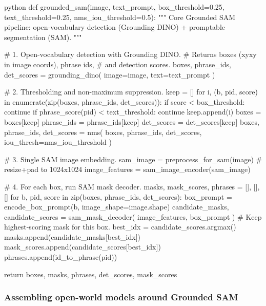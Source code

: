 \begin{enrichment}
\begin{enrichment}
			\begin{mintedbox}{python}
				def grounded_sam(image,       text_prompt,
				    box_threshold=0.25,
				    text_threshold=0.25,
				    nms_iou_threshold=0.5):
				    """
				    Core Grounded SAM pipeline:
				    open-vocabulary detection (Grounding DINO)
				    + promptable segmentation (SAM).
				    """
				
				    # 1. Open-vocabulary detection with Grounding DINO.
				    #    Returns boxes (xyxy in image coords), phrase ids,
				    #    and detection scores.
				    boxes, phrase_ids, det_scores = grounding_dino(
				    image=image,
				    text=text_prompt
				    )
				
				    # 2. Thresholding and non-maximum suppression.
				    keep = []
				    for i, (b, pid, score) in enumerate(zip(boxes,
				    phrase_ids,
				    det_scores)):
				        if score < box_threshold:
				            continue
				        if phrase_score(pid) < text_threshold:
				            continue
				        keep.append(i)
				    boxes = boxes[keep]
				    phrase_ids = phrase_ids[keep]
				    det_scores = det_scores[keep]
				    boxes, phrase_ids, det_scores = nms(
				    boxes, phrase_ids, det_scores,
				    iou_thresh=nms_iou_threshold
				    )
				
				    # 3. Single SAM image embedding.
				    sam_image = preprocess_for_sam(image)  # resize+pad to 1024x1024
				    image_features = sam_image_encoder(sam_image)
				
				    # 4. For each box, run SAM mask decoder.
				    masks, mask_scores, phrases = [], [], []
				    for b, pid, score in zip(boxes, phrase_ids, det_scores):
				        box_prompt = encode_box_prompt(b, image_shape=image.shape)
				        candidate_masks, candidate_scores = sam_mask_decoder(
				        image_features, box_prompt
				        )
				        # Keep highest-scoring mask for this box.
				        best_idx = candidate_scores.argmax()
				        masks.append(candidate_masks[best_idx])
				        mask_scores.append(candidate_scores[best_idx])
				        phrases.append(id_to_phrase(pid))
				
				    return boxes, masks, phrases, det_scores, mask_scores
			\end{mintedbox}
		
		\subsubsection{Assembling open-world models around Grounded SAM}
		\label{subsubsec:chapter15_groundedsam_assembly}
		

\end{enrichment}
\end{enrichment}
